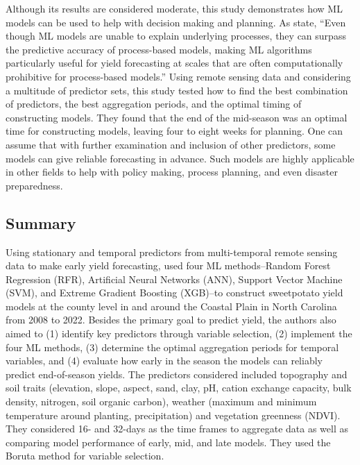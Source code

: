 \documentclass[
]{book}
\begin{document}
Although its results are considered moderate, this study demonstrates how ML models can be used to help with decision making and planning. As \citet{carbajal-carrasco2024} state, ``Even though ML models are unable to explain underlying processes, they can surpass the predictive accuracy of process-based models, making ML algorithms particularly useful for yield forecasting at scales that are often computationally prohibitive for process-based models.'' Using remote sensing data and considering a multitude of predictor sets, this study tested how to find the best combination of predictors, the best aggregation periods, and the optimal timing of constructing models. They found that the end of the mid-season was an optimal time for constructing models, leaving four to eight weeks for planning. One can assume that with further examination and inclusion of other predictors, some models can give reliable forecasting in advance. Such models are highly applicable in other fields to help with policy making, process planning, and even disaster preparedness.

\hypertarget{summary-2}{%
\subsection{Summary}\label{summary-2}}

Using stationary and temporal predictors from multi-temporal remote sensing data to make early yield forecasting, \citet{carbajal-carrasco2024} used four ML methods--Random Forest Regression (RFR), Artificial Neural Networks (ANN), Support Vector Machine (SVM), and Extreme Gradient Boosting (XGB)--to construct sweetpotato yield models at the county level in and around the Coastal Plain in North Carolina from 2008 to 2022. Besides the primary goal to predict yield, the authors also aimed to (1) identify key predictors through variable selection, (2) implement the four ML methods, (3) determine the optimal aggregation periods for temporal variables, and (4) evaluate how early in the season the models can reliably predict end-of-season yields. The predictors considered included topography and soil traits (elevation, slope, aspect, sand, clay, pH, cation exchange capacity, bulk density, nitrogen, soil organic carbon), weather (maximum and minimum temperature around planting, precipitation) and vegetation greenness (NDVI). They considered 16- and 32-days as the time frames to aggregate data as well as comparing model performance of early, mid, and late models. They used the Boruta method for variable selection.
\end{document}
